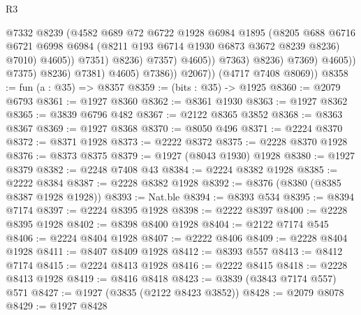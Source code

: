 \begin{lexlean}{R3}
\begin{coremodule}
                                            @7332
                                            @8239
                                            (@4582
                                              @689
                                              @72
                                              @6722
                                              @1928
                                              @6984
                                              @1895
                                              (@8205
                                                @688
                                                @6716
                                                @6721
                                                @6998
                                                @6984
                                                (@8211 @193 @6714 @1930 @6873 @3672 @8239 @8236)
                                                @7010)
                                              @4605))
                                          @7351)
                                        @8236)
                                      @7357)
                                    @4605))
                                @7363)
                              @8236)
                            @7369)
                          @4605))
                      @7375)
                    @8236)
                  @7381)
                @4605)
              @7386))
          @2067))
      (@4717 @7408 @8069))
@8358 := fun (a : @35) => @8357
@8359 := (bits : @35) -> @1925
@8360 := @2079 @6793
@8361 := @1927 @8360
@8362 := @8361 @1930
@8363 := @1927 @8362
@8365 := @3839 @6796 @482
@8367 := @2122 @8365 @3852
@8368 := @8363 @8367
@8369 := @1927 @8368
@8370 := @8050 @496
@8371 := @2224 @8370
@8372 := @8371 @1928
@8373 := @2222 @8372
@8375 := @2228 @8370 @1928
@8376 := @8373 @8375
@8379 := @1927 (@8043 @1930) @1928
@8380 := @1927 @8379
@8382 := @2248 @7408 @43
@8384 := @2224 @8382 @1928
@8385 := @2222 @8384
@8387 := @2228 @8382 @1928
@8392 := @8376 (@8380 (@8385 @8387 @1928 @1928))
@8393 := Nat.ble
@8394 := @8393 @534
@8395 := @8394 @7174
@8397 := @2224 @8395 @1928
@8398 := @2222 @8397
@8400 := @2228 @8395 @1928
@8402 := @8398 @8400 @1928
@8404 := @2122 @7174 @545
@8406 := @2224 @8404 @1928
@8407 := @2222 @8406
@8409 := @2228 @8404 @1928
@8411 := @8407 @8409 @1928
@8412 := @8393 @557
@8413 := @8412 @7174
@8415 := @2224 @8413 @1928
@8416 := @2222 @8415
@8418 := @2228 @8413 @1928
@8419 := @8416 @8418
@8423 := @3839 (@3843 @7174 @557) @571
@8427 := @1927 (@3835 (@2122 @8423 @3852))
@8428 := @2079 @8078
@8429 := @1927 @8428

\end{coremodule}
\end{lexlean}
